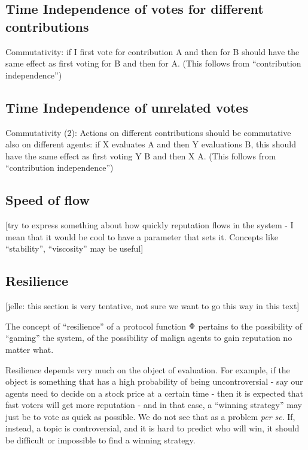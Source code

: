 \documentclass{article}
\begin{document}
\subsection{Time Independence of votes for different contributions}


Commutativity: if I first vote for contribution A and then for B should have the same effect as first voting for B and then for A.
(This follows from ``contribution independence'')

\subsection{Time Independence of unrelated votes}


Commutativity (2): Actions on different contributions should be commutative also on different agents: 
if X evaluates A and then Y evaluations B, this should have the same effect as first voting Y B and then X A.
(This follows from ``contribution independence'')

\subsection{Speed of flow}

[try to express something about how quickly reputation flows in the system - I mean that it would be cool to have a parameter that sets it. Concepts like ``stability'', ``viscosity'' may be useful]

\subsection{Resilience}

[jelle: this section is very tentative, not sure we want to go this way in this text]

The concept of ``resilience'' of a protocol function $\Phi$ pertains to the possibility of ``gaming'' the system, of the possibility of malign agents to gain reputation no matter what.

Resilience depends very much on the object of evaluation. For example, if the object is something that has a high probability of being uncontroversial - say our agents need to decide on a stock price at a certain time - then it is expected that fast voters will get more reputation - and in that case, a ``winning strategy'' may just be to vote as quick as possible. We do not see that as a problem {\em per se}.
If, instead, a topic is controversial, and it is hard to predict who will win, it should be difficult or impossible to find a winning strategy. 
\end{document}
